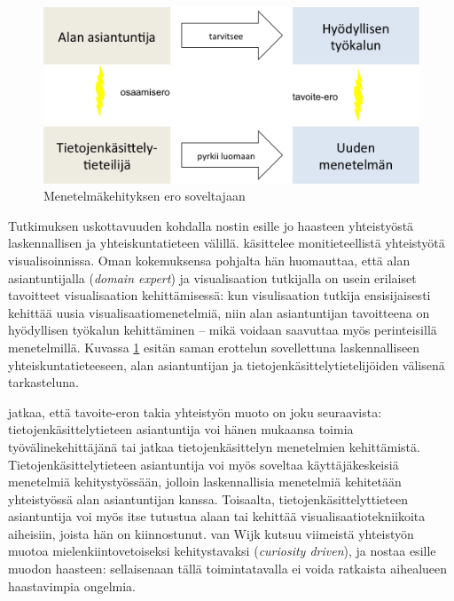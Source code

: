 \documentclass[finnish,gradu,twoside,12pt]{tktltiki}
\begin{document}
{\begin{figure}
\includegraphics[width=.6\textwidth]{images/monitieteellisyys_ongelma.png} 
\caption{Menetelmäkehityksen ero soveltajaan \citep[mukaillen][7]{Wijk2006}}
\label{fig:domain_expert_vs_computation_specialist}

\end{figure}

Tutkimuksen uskottavuuden kohdalla nostin esille jo haasteen yhteistyöstä laskennallisen ja yhteiskuntatieteen välillä. \citet{Wijk2006} käsittelee monitieteellistä yhteistyötä visualisoinnissa. Oman kokemuksensa pohjalta hän huomauttaa, että alan asiantuntijalla (\textit{domain expert}) ja visualisaation tutkijalla on usein erilaiset tavoitteet visualisaation kehittämisessä: kun visulisaation tutkija ensisijaisesti kehittää uusia visualisaatiomenetelmiä, niin alan asiantuntijan tavoitteena on hyödyllisen työkalun kehittäminen -- mikä voidaan saavuttaa myös perinteisillä menetelmillä. Kuvassa \ref{fig:domain_expert_vs_computation_specialist} esitän saman erottelun sovellettuna laskennalliseen yhteiskuntatieteeseen, alan asiantuntijan ja tietojenkäsittelytietelijöiden välisenä tarkasteluna.

\citet{Wijk2006} jatkaa, että tavoite-eron takia yhteistyön muoto on joku seuraavista: tietojenkäsittelytieteen asiantuntija voi hänen mukaansa toimia työvälinekehittäjänä tai jatkaa tietojenkäsittelyn menetelmien kehittämistä. Tietojenkäsittelytieteen asiantuntija voi myös soveltaa käyttäjäkeskeisiä menetelmiä kehitystyössään, jolloin laskennallisia menetelmiä kehitetään yhteistyössä alan asiantuntijan kanssa. Toisaalta, tietojenkäsittelyttieteen asiantuntija voi myös itse tutustua alaan tai kehittää visualisaatiotekniikoita aiheisiin, joista hän on kiinnostunut. van Wijk kutsuu viimeistä yhteistyön muotoa mielenkiintovetoiseksi kehitystavaksi (\textit{curiosity driven}), ja nostaa esille muodon haasteen: sellaisenaan tällä toimintatavalla ei voida ratkaista aihealueen haastavimpia ongelmia.

}
\end{document}
